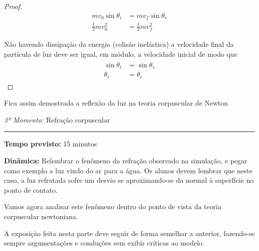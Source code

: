 \begin{proof}
        \begin{subequations}
            \begin{align}
                mv_0\sin\theta_i&=mv_f\sin\theta_r\label{eq:cons-momento-pla3}\\
                \frac{1}{2}mv_0^2&=\frac{1}{2}mv_f^2\label{eq:cons-energia-pla3}
            \end{align}
        \end{subequations}

        Não havendo dissipação da energia (colisão inelástica) a velocidade final da partícula de luz deve ser igual, em módulo, a velocidade inicial de modo que
        \begin{align}
            \begin{split}
                \sin\theta_i&=\sin\theta_r\\
                \theta_i&=\theta_r
            \end{split}
        \end{align}
    \end{proof}
    Fica assim demostrada a reflexão da luz na teoria corpuscular de Newton

    \vspace{50pt}
    \noindent \emph{3º Momento:} Refração corpuscular
	\par\noindent\rule{.3\textwidth}{.5pt}    
    \par\noindent \textbf{Tempo previsto: }15 minutos

    \noindent \textbf{Dinâmica:} Relembrar o fenômeno da refração observado na simulação, e pegar como exemplo a luz vindo do ar para a água. Os alunos devem lembrar que neste caso, a luz refratada sofre um desvio se aproximando-se da normal à superfície no ponto de contato.

    Vamos agora analisar este fenômeno dentro do ponto de vista da teoria corpuscular newtoniana.

    A exposição feita nesta parte deve seguir de forma semelhar a anterior, fazendo-se sempre argumentações e conduções sem exibir críticas ao modelo.

